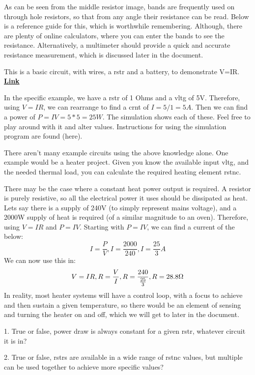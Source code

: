\documentclass[a4paper,11pt]{report}
\newcommand{\Examples}[1] %
{
\par\noindent %
\phantomsection %
\todo[inline, color=red!30]{\textbf{#1}} %
\vspace{1em} %
}
\newcommand{\Quiz}[1] %
{
\par\noindent %
\phantomsection %
\todo[inline, color=blue!30]{\textbf{#1}} %
\vspace{1em} %
}
\let\oldhref\href %
\renewcommand{\href}[2]{\oldhref{#1}{\bfseries#2}}
\begin{document}
As can be seen from the middle resistor image, bands are frequently used on through hole resistors, so that from any angle their resistance can be read. Below is a reference guide for this, which is worthwhile remembering. Although, there are plenty of online calculators, where you can enter the bands to see the resistance. Alternatively, a multimeter should provide a quick and accurate resistance measurement, which is discussed later in the document.



\Examples{Example circuits etc}

This is a basic circuit, with wires, a \gls{rstr} and a battery, to demonstrate V=IR. \href{https://tinyurl.com/27gj49kj}{Link}

In the specific example, we have a \gls{rstr} of 1 Ohms and a \gls{vltg} of 5V. Therefore, using $V=IR$, we can rearrange to find a \gls{crnt} of $I = 5/1 = 5A$. Then we can find a power of $P = IV = 5*5 = 25W$. The simulation shows each of these. Feel free to play around with it and alter values. Instructions for using the simulation program are found (here).

There aren't many example circuits using the above knowledge alone. One example would be a heater project. Given you know the available input \gls{vltg}, and the needed thermal load, you can calculate the required heating element \gls{rstnc}.

There may be the case where a constant heat power output is required. A resistor is purely resistive, so all the electrical power it uses should be dissipated as heat. Lets say there is a supply of 240V (to simply represent mains voltage), and a 2000W supply of heat is required (of a similar magnitude to an oven). Therefore, using $V=IR$ and $P=IV$. Starting with $P=IV$, we can find a current of the below:
\[I=\frac{P}{V}, I=\frac{2000}{240}, I=\frac{25}{3}A\]
We can now use this in:
\[V=IR, R=\frac{V}{I}, R=\frac{240}{\frac{25}{3}}, R=28.8\ohm\]
In reality, most heater systems will have a control loop, with a focus to achieve and then sustain a given temperature, so there would be an element of sensing and turning the heater on and off, which we will get to later in the document.

\Quiz{Quiz}

1. True or false, power draw is always constant for a given \gls{rstr}, whatever circuit it is in?

2. True or false, \gls{rstr}s are available in a wide range of \gls{rstnc} values, but multiple can be used together to achieve more specific values?
\end{document}
